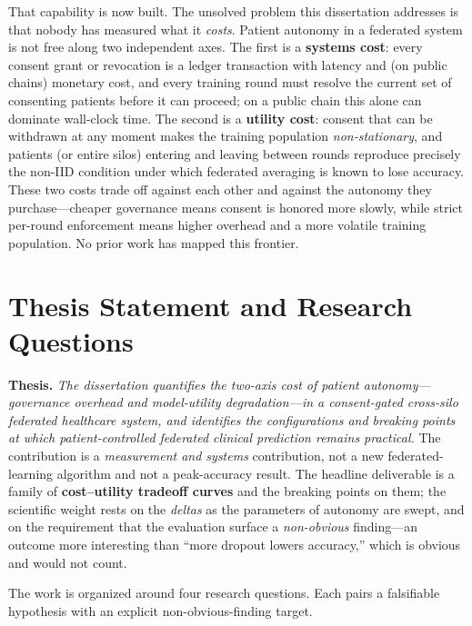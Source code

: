 \documentclass[12pt]{report}
\begin{document}
That capability is now built. The unsolved problem this dissertation addresses is
that nobody has measured what it \emph{costs}. Patient autonomy in a federated
system is not free along two independent axes. The first is a \textbf{systems
cost}: every consent grant or revocation is a ledger transaction with latency and
(on public chains) monetary cost, and every training round must resolve the
current set of consenting patients before it can proceed; on a public chain this
alone can dominate wall-clock time. The second is a \textbf{utility cost}: consent
that can be withdrawn at any moment makes the training population
\emph{non-stationary}, and patients (or entire silos) entering and leaving between
rounds reproduce precisely the non-IID condition under which federated averaging
is known to lose accuracy. These two costs trade off against each other and
against the autonomy they purchase---cheaper governance means consent is honored
more slowly, while strict per-round enforcement means higher overhead and a more
volatile training population. No prior work has mapped this frontier.

\section{Thesis Statement and Research Questions}\label{sec:thesis}

\noindent\textbf{Thesis.} \emph{The dissertation quantifies the two-axis cost of
patient autonomy---governance overhead and model-utility degradation---in a
consent-gated cross-silo federated healthcare system, and identifies the
configurations and breaking points at which patient-controlled federated
clinical prediction remains practical.} The contribution is a \emph{measurement and systems}
contribution, not a new federated-learning algorithm and not a peak-accuracy
result. The headline deliverable is a family of \textbf{cost--utility tradeoff
curves} and the breaking points on them; the scientific weight rests on the
\emph{deltas} as the parameters of autonomy are swept, and on the requirement that
the evaluation surface a \emph{non-obvious} finding---an outcome more interesting
than ``more dropout lowers accuracy,'' which is obvious and would not count.

The work is organized around four research questions. Each pairs a falsifiable
hypothesis with an explicit non-obvious-finding target.
\end{document}
